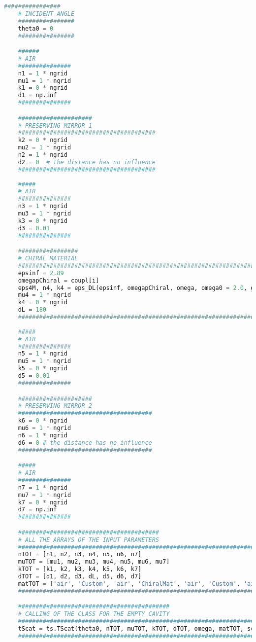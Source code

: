 \documentclass[aps,prl,10pt,onecolumn,superscriptaddress]{revtex4-2}
\begin{document}
\begin{lstlisting}[language=Python, caption=Script for Figure 15]
    ################
    # INCIDENT ANGLE
    ################
    theta0 = 0
    ################

    ######
    # AIR
    ###############
    n1 = 1 * ngrid
    mu1 = 1 * ngrid
    k1 = 0 * ngrid
    d1 = np.inf
    ###############

    #####################
    # PRESERVING MIRROR 1
    #######################################
    k2 = 0 * ngrid
    mu2 = 1 * ngrid
    n2 = 1 * ngrid
    d2 = 0  # the distance has no influence
    #######################################
    
    #####
    # AIR 
    ###############
    n3 = 1 * ngrid
    mu3 = 1 * ngrid
    k3 = 0 * ngrid
    d3 = 0.01
    ###############

    #################
    # CHIRAL MATERIAL
    #########################################################################################
    epsinf = 2.89
    omegapChiral = coupl[i]
    eps4M, n4, k4 = eps_DL(epsinf, omegapChiral, omega, omega0 = 2.0, gamma = 0.05, k0 = 0.0)
    mu4 = 1 * ngrid
    k4 = 0 * ngrid
    dL = 180
    ######################################################################################### 
       
    #####
    # AIR 
    ###############
    n5 = 1 * ngrid
    mu5 = 1 * ngrid
    k5 = 0 * ngrid
    d5 = 0.01
    ###############

    #####################
    # PRESERVING MIRROR 2
    ######################################
    k6 = 0 * ngrid
    mu6 = 1 * ngrid
    n6 = 1 * ngrid
    d6 = 0 # the distance has no influence
    ######################################  

    #####
    # AIR
    ###############
    n7 = 1 * ngrid
    mu7 = 1 * ngrid
    k7 = 0 * ngrid
    d7 = np.inf
    ###############

    ########################################
    # ALL THE ARRAYS OF THE INPUT PARAMETERS
    #############################################################################
    nTOT = [n1, n2, n3, n4, n5, n6, n7] 
    muTOT = [mu1, mu2, mu3, mu4, mu5, mu6, mu7]
    kTOT = [k1, k2, k3, k4, k5, k6, k7] 
    dTOT = [d1, d2, d3, dL, d5, d6, d7] 
    matTOT = ['air', 'Custom', 'air', 'ChiralMat', 'air', 'Custom', 'air']
    #############################################################################

    ###########################################
    # CALLING OF THE CLASS FOR THE EMPTY CAVITY
    #########################################################################
    tScat = ts.TScat(theta0, nTOT, muTOT, kTOT, dTOT, omega, matTOT, scatTOT)  
    #########################################################################
    

\end{lstlisting}
\end{document}
